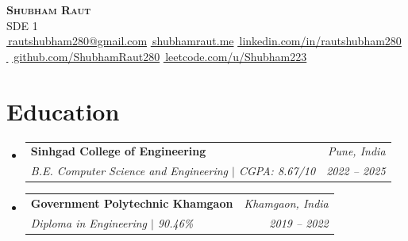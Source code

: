 \documentclass[letterpaper,10pt]{article}
\makeatletter
\newcommand{\iconlink}[3]{\mbox{\href{#2}{\textcolor{accent}{\raisebox{-0.12ex}{#1}\,#3}}}}
\newcommand{\resumeSubheading}[4]{
  \item[]
    \begin{tabular*}{\linewidth}[t]{@{}l@{\extracolsep{\fill}}r@{}}
      \textbf{#1} & \textit{\small #2} \\
      \textit{\small #3} & \textit{\small #4} \\
    \end{tabular*}
}
\newcommand{\resumeSubHeadingListStart}{\begin{itemize}[leftmargin=0pt, label={}, nosep, itemsep=4pt]}
\newcommand{\resumeSubHeadingListEnd}{\end{itemize}}
\makeatother
\begin{document}
\begin{center}
  {\Huge \scshape \textbf{Shubham Raut}} \\[3pt]
  {\large SDE 1} \\[3pt]
  \normalsize
  \iconlink{\faEnvelope}{mailto:rautshubham280@gmail.com}{rautshubham280@gmail.com} \quad
  \iconlink{\faGlobe}{https://www.shubhamraut.me/}{shubhamraut.me} \quad
  \iconlink{\faLinkedin}{https://www.linkedin.com/in/rautshubham280/}{linkedin.com/in/rautshubham280} \\[2pt]
  \ifdefined\resumePhone\iconlink{\faPhone}{tel:\resumePhoneTel}{\resumePhone} \quad\fi
  \iconlink{\faGithub}{https://github.com/ShubhamRaut280}{github.com/ShubhamRaut280} \quad
  \iconlink{\faCode}{https://leetcode.com/u/Shubham223/}{leetcode.com/u/Shubham223}
\end{center}
\vspace{-8pt}

\section{Education}
\resumeSubHeadingListStart
  \resumeSubheading
    {Sinhgad College of Engineering}{Pune, India}
    {B.E. Computer Science and Engineering $|$ CGPA: 8.67/10}{2022 -- 2025}
  \resumeSubheading
    {Government Polytechnic Khamgaon}{Khamgaon, India}
    {Diploma in Engineering $|$ 90.46\%}{2019 -- 2022}
\resumeSubHeadingListEnd
\end{document}
